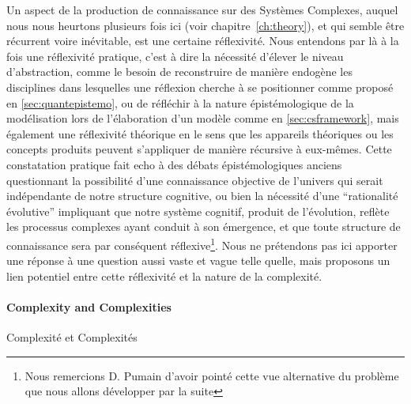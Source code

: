 Un aspect de la production de connaissance sur des Systèmes Complexes, auquel nous nous heurtons plusieurs fois ici (voir chapitre~\ref{ch:theory}), et qui semble être récurrent voire inévitable, est une certaine réflexivité. Nous entendons par là à la fois une réflexivité pratique, c'est à dire la nécessité d'élever le niveau d'abstraction, comme le besoin de reconstruire de manière endogène les disciplines dans lesquelles une réflexion cherche à se positionner comme proposé en \ref{sec:quantepistemo}, ou de réfléchir à la nature épistémologique de la modélisation lors de l'élaboration d'un modèle comme en \ref{sec:csframework}, mais également une réflexivité théorique en le sens que les appareils théoriques ou les concepts produits peuvent s'appliquer de manière récursive à eux-mêmes. Cette constatation pratique fait echo à des débats épistémologiques anciens questionnant la possibilité d'une connaissance objective de l'univers qui serait indépendante de notre structure cognitive, ou bien la nécessité d'une ``rationalité évolutive'' impliquant que notre système cognitif, produit de l'évolution, reflète les processus complexes ayant conduit à son émergence, et que toute structure de connaissance sera par conséquent réflexive\footnote{Nous remercions D. Pumain d'avoir pointé cette vue alternative du problème que nous allons développer par la suite}. Nous ne prétendons pas ici apporter une réponse à une question aussi vaste et vague telle quelle, mais proposons un lien potentiel entre cette réflexivité et la nature de la complexité.


\paragraph{Complexity and Complexities}{Complexité et Complexités}

